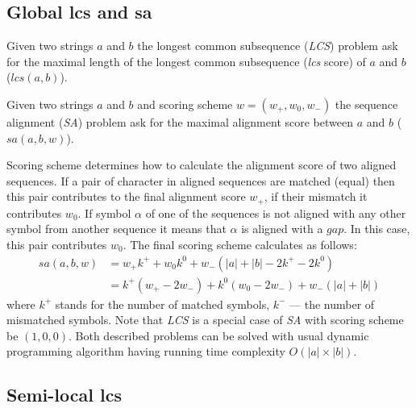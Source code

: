 \subsection{Global lcs and sa}

\begin{definition}
Given two strings $a$ and $b$  the longest common subsequence (\emph{LCS}) problem ask for the maximal length of the longest common subsequence (\emph{lcs} score) of $a$ and $b$ ($lcs(a,b)$).
\end{definition} 

\begin{definition}
Given two strings $a$ and $b$ and scoring scheme $w=(w_{+},w_{0},w_{-})$ the sequence alignment (\emph{SA}) problem ask for the maximal alignment score between $a$ and $b$ ($sa(a,b,w)$).
\end{definition}

Scoring scheme determines how to calculate the alignment score of two aligned sequences.
If a pair of character in aligned sequences are matched (equal) then this pair contributes to the final alignment score $w_{+}$, if their mismatch it contributes $w_{0}$.
If symbol $\alpha$ of one of the sequences is not aligned with any other symbol from another sequence it means that $\alpha$ is aligned with a $gap$.
In this case, this pair contributes $w_{0}$.
The final scoring scheme calculates as follows:
\begin{equation}\label{formula:sa}
\begin{array}{ll}
    sa(a,b,w) &= w_{+}k^{+} + w_{0}k^{0} + w_{-} (|a| + |b| - 2k^{+} - 2k^{0}) \\
    &= k^{+} (w_{+} - 2w_{-} ) + k^{0}  (w_{0} - 2w_{-}) + w_{-}(|a| + |b|)
\end{array}
\end{equation}
where $k^{+}$ stands for the number of matched symbols, $k^{-}$ --- the number of mismatched symbols.
Note that \emph{LCS} is a special case of \emph{SA} with scoring scheme be $(1,0,0)$.
Both described problems can be solved with usual dynamic programming algorithm having running time complexity $O(|a|\times|b|)$.

\subsection{Semi-local lcs}

